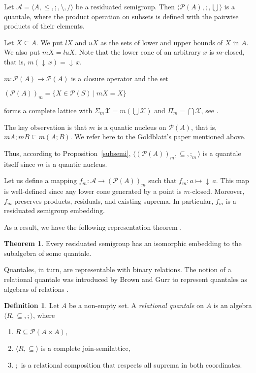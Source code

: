\documentclass[a4paper]{article}
\theoremstyle{definition}
\newtheorem{definition}{Definition}
\theoremstyle{theorem}
\newtheorem{theorem}{Theorem}
\theoremstyle{proposition}
\theoremstyle{lemma}
\theoremstyle{ex}
\theoremstyle{corollary}
\theoremstyle{claim}
\newcommand{\down}[1]{\ensuremath{{\downarrow}\,#1}}
\begin{document}
Let $\mathcal{A} = \langle A, \leq, ;, \setminus, / \rangle$ be a residuated semigroup. Then $\langle \mathcal{P}(A), ;, \bigcup \rangle$ is a quantale, where the product operation on subsets is defined with the pairwise products of their elements.

Let $X \subseteq A$. We put $lX$ and $uX$ as the sets of lower and upper bounds of $X$ in $A$. We also put $m X = lu X$.
Note that the lower cone of an arbitrary $x$ is $m$-closed, that is,
$m (\down{x}) = \down{x}$.

$m : \mathcal{P}(A) \to \mathcal{P}(A)$ is a closure operator and the set

\begin{center}
$(\mathcal{P}(A))_m = \{ X \in \mathcal{P}(S) \: | \: m X = X\}$
\end{center}
forms a complete lattice with $\Sigma_{m} \mathcal{X} = m ( \bigcup \mathcal{X})$ and $\Pi_{m} = \bigcap \mathcal{X}$, see \cite[Theorem 7.3]{davey2002introduction}.

The key observation is that $m$ is a quantic nucleus on $\mathcal{P}(A)$, that is, $m A ; m B \subseteq m (A ; B)$. We refer here to the Goldblatt's paper mentioned above.

Thus, according to Proposition~\ref{subsemi}, $\langle (\mathcal{P}(A))_m, \subseteq, ;_m \rangle$ is a quantale itself since $m$ is a quantic nucleus.

Let us define a mapping $f_m : \mathcal{A} \to (\mathcal{P}(A))_m$ such that $f_m : a \mapsto \down{a}$. This map is well-defined since any lower cone generated by a point is $m$-closed. Moreover, $f_m$ preserves products, residuals, and existing suprema. In particular, $f_m$ is a residuated semigroup embedding.

As a result, we have the following representation theorem \cite[Corollary 2]{goldblatt2006kripke}.

\begin{theorem} \label{orsRep}
  Every residuated semigroup has an isomorphic embedding to the subalgebra of some quantale.
\end{theorem}

Quantales, in turn, are representable with binary relations. The notion of a relational quantale was introduced by Brown and Gurr to represent quantales as algebras of relations \cite{brown1993representation}.
\begin{definition}
  Let $A$ be a non-empty set. A \emph{relational quantale} on $A$ is an algebra $\langle R, \subseteq, ; \rangle$, where
  \begin{enumerate}
    \item $R \subseteq \mathcal{P}(A \times A)$,
    \item $\langle R, \subseteq \rangle$ is a complete join-semilattice,
    \item $;$ is a relational composition that respects all suprema in both coordinates.
  \end{enumerate}
\end{definition}
\end{document}
